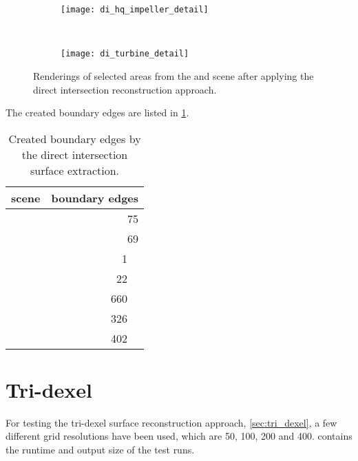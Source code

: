 \begin{figure}
	\centering
	\begin{subfigure}[b]{\textwidth}
		\centering
		\texttt{[image: di\_hq\_impeller\_detail]}
		\caption{\impeller}
		\label{fig:di_impeller_detail}
	\end{subfigure}\\
	\begin{subfigure}[b]{\textwidth}
		\centering
		\texttt{[image: di\_turbine\_detail]}
		\caption{\turbine}
		\label{fig:di_turbine_detail}
	\end{subfigure}
	\caption[Direct intersection artifacts]{
		Renderings of selected areas from the \impeller {} and \turbine {} scene after applying the direct intersection reconstruction approach.
	}
	\label{fig:di_scenes_artifacts}
\end{figure}

The created boundary edges are listed in \cref{tbl:direct_intersection_boundary_edges}.

\begin{table}
	\centering
	\begin{tabular}{l|r}
		scene         &  boundary edges         \\
		\midrule
		\cubes        & \SI{ 75}{     \nothing} \\
		\cylindersd   & \SI{ 69}{     \nothing} \\
		\cylinders    & \SI{  1}{\kilo\nothing} \\ %
		\cylinderhead & \SI{ 22}{\kilo\nothing} \\ %
		\impeller     & \SI{660}{\kilo\nothing} \\ %
		\impellerhalf & \SI{326}{\kilo\nothing} \\ %
		\turbine      & \SI{402}{\kilo\nothing} \\ %
	\end{tabular}
	\caption[Direct intersection boundary edges]{
		Created boundary edges by the direct intersection surface extraction.
	}
	\label{tbl:direct_intersection_boundary_edges}
\end{table}


\section{Tri-dexel}
\label{sec:tri_dexel_results}

For testing the tri-dexel surface reconstruction approach, \cf \cref{sec:tri_dexel}, a few different grid resolutions have been used, which are 50, 100, 200 and 400.
 contains the runtime and output size of the test runs.

